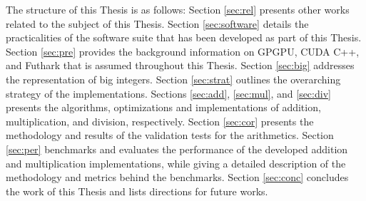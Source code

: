 The structure of this Thesis is as follows: Section \ref{sec:rel} presents other
works related to the subject of this Thesis. Section \ref{sec:software} details
the practicalities of the software suite that has been developed as part of this
Thesis. Section \ref{sec:pre} provides the background information on GPGPU, CUDA
C++, and Futhark that is assumed throughout this Thesis. Section \ref{sec:big}
addresses the representation of big integers. Section \ref{sec:strat} outlines
the overarching strategy of the implementations. Sections \ref{sec:add},
\ref{sec:mul}, and \ref{sec:div} presents the algorithms, optimizations and
implementations of addition, multiplication, and division, respectively. Section
\ref{sec:cor} presents the methodology and results of the validation tests for
the arithmetics. Section \ref{sec:per} benchmarks and evaluates the performance
of the developed addition and multiplication implementations, while giving a
detailed description of the methodology and metrics behind the
benchmarks. Section \ref{sec:conc} concludes the work of this Thesis and lists
directions for future works.

